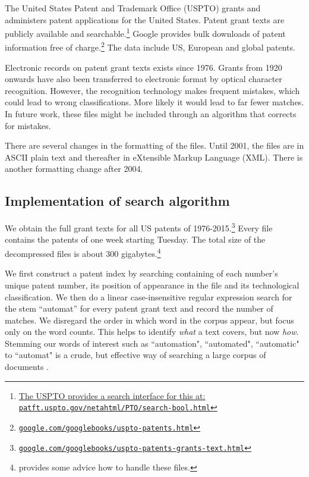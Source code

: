 \documentclass[11pt,a4paper]{article}
\begin{document}
The United States Patent and Trademark Office (USPTO) grants and administers patent applications for the United States. Patent grant texts are publicly available and searchable.\footnote{\href{http://patft.uspto.gov/netahtml/PTO/search-bool.html}{The USPTO provides a search interface for this at: \texttt{patft.uspto.gov/netahtml/PTO/search-bool.html}}} Google provides bulk downloads of patent information free of charge.\footnote{\href{www.google.com/googlebooks/uspto-patents.html}{\texttt{google.com/googlebooks/uspto-patents.html}}} The data include US, European and global patents. 

Electronic records on patent grant texts exists since 1976. Grants from 1920 onwards have also been transferred to electronic format by optical character recognition. However, the recognition technology makes frequent mistakes, which could lead to wrong classifications. More likely it would lead to far fewer matches. In future work, these files might be included through an algorithm that corrects for mistakes.

There are several changes in the formatting of the files. Until 2001, the files are in ASCII plain text and thereafter in eXtensible Markup Language (XML). There is another formatting change after 2004.


\subsection{Implementation of search algorithm}
We obtain the full grant texts for all US patents of 1976-2015.\footnote{\href{http://www.google.com/googlebooks/uspto-patents-grants-text.html}{\texttt{google.com/googlebooks/uspto-patents-grants-text.html}}}  Every file contains the patents of one week starting Tuesday. The total size of the decompressed files is about 300 gigabytes.\footnote{\cite{F2013} provides some advice how to handle these files.}  

We first construct a patent index by searching containing of each number's unique patent number, its position of appearance in the file and its technological classification. We then do a linear case-insensitive regular expression search for the stem ``automat'' for every patent grant text and record the number of matches. We disregard the order in which word in the corpus appear, but focus only on the word counts. This helps to identify \textit{what} a text covers, but now \textit{how}. Stemming our words of interest such as ``automation", ``automated", ``automatic" to ``automat" is a crude, but effective way of searching a large corpus of documents \citep{MRS2009}.
\end{document}
